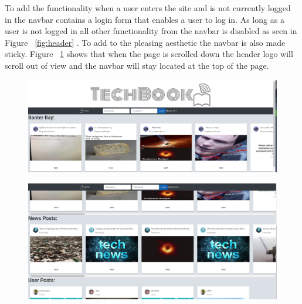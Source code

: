 To add the functionality when a user enters the site and is not currently logged in the navbar contains a login form that enables a user to log in. As long as a user is not logged in all other functionality from the navbar is disabled as seen in Figure ~\ref{fig:header} . To add to the pleasing aesthetic the navbar is also made sticky. Figure ~\ref{fig:headerStick} shows that when the page is scrolled down the header logo will scroll out of view and the navbar will stay located at the top of the page.

\begin{figure}[H]
\centering
\begin{minipage}{.5\textwidth}
  \centering
  \includegraphics[width=.9\linewidth]{img/ui/headerPC.PNG}
  \label{fig:header}
\end{minipage}%
\begin{minipage}{.5\textwidth}
  \centering
  \includegraphics[width=.9\linewidth]{img/ui/headerpcsticky.PNG}
  \label{fig:headerStick}
\end{minipage}
\end{figure}

